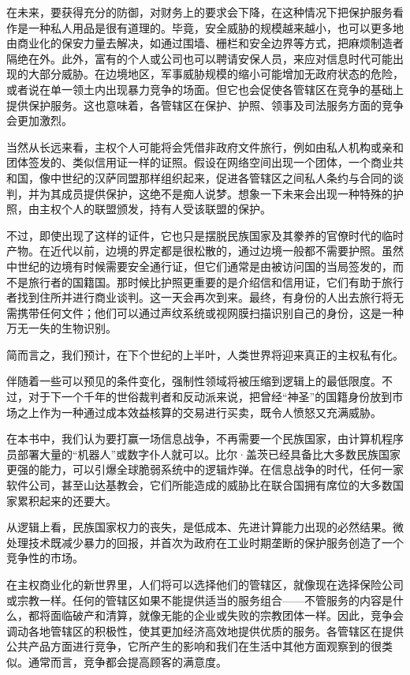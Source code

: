 在未来，要获得充分的防御，对财务上的要求会下降，在这种情况下把保护服务看作是一种私人用品是很有道理的。毕竟，安全威胁的规模越来越小，也可以更多地由商业化的保安力量去解决，如通过围墙、栅栏和安全边界等方式，把麻烦制造者隔绝在外。此外，富有的个人或公司也可以聘请安保人员，来应对信息时代可能出现的大部分威胁。在边境地区，军事威胁规模的缩小可能增加无政府状态的危险，或者说在单一领土内出现暴力竞争的场面。但它也会促使各管辖区在竞争的基础上提供保护服务。这也意味着，各管辖区在保护、护照、领事及司法服务方面的竞争会更加激烈。

当然从长远来看，主权个人可能将会凭借非政府文件旅行，例如由私人机构或亲和团体签发的、类似信用证一样的证照。假设在网络空间出现一个团体，一个商业共和国，像中世纪的汉萨同盟那样组织起来，促进各管辖区之间私人条约与合同的谈判，并为其成员提供保护，这绝不是痴人说梦。想象一下未来会出现一种特殊的护照，由主权个人的联盟颁发，持有人受该联盟的保护。

不过，即使出现了这样的证件，它也只是摆脱民族国家及其豢养的官僚时代的临时产物。在近代以前，边境的界定都是很松散的，通过边境一般都不需要护照。虽然中世纪的边境有时候需要安全通行证，但它们通常是由被访问国的当局签发的，而不是旅行者的国籍国。那时候比护照更重要的是介绍信和信用证，它们有助于旅行者找到住所并进行商业谈判。这一天会再次到来。最终，有身份的人出去旅行将无需携带任何文件；他们可以通过声纹系统或视网膜扫描识别自己的身份，这是一种万无一失的生物识别。

简而言之，我们预计，在下个世纪的上半叶，人类世界将迎来真正的主权私有化。

伴随着一些可以预见的条件变化，强制性领域将被压缩到逻辑上的最低限度。不过，对于下一个千年的世俗裁判者和反动派来说，把曾经“神圣”的国籍身份放到市场之上作为一种通过成本效益核算的交易进行买卖，既令人愤怒又充满威胁。

在本书中，我们认为要打赢一场信息战争，不再需要一个民族国家，由计算机程序员部署大量的“机器人”或数字仆人就可以。比尔·盖茨已经具备比大多数民族国家更强的能力，可以引爆全球脆弱系统中的逻辑炸弹。在信息战争的时代，任何一家软件公司，甚至山达基教会，它们所能造成的威胁比在联合国拥有席位的大多数国家累积起来的还要大。

从逻辑上看，民族国家权力的丧失，是低成本、先进计算能力出现的必然结果。微处理技术既减少暴力的回报，并首次为政府在工业时期垄断的保护服务创造了一个竞争性的市场。

在主权商业化的新世界里，人们将可以选择他们的管辖区，就像现在选择保险公司或宗教一样。任何的管辖区如果不能提供适当的服务组合——不管服务的内容是什么，都将面临破产和清算，就像无能的企业或失败的宗教团体一样。因此，竞争会调动各地管辖区的积极性，使其更加经济高效地提供优质的服务。各管辖区在提供公共产品方面进行竞争，它所产生的影响和我们在生活中其他方面观察到的很类似。通常而言，竞争都会提高顾客的满意度。

